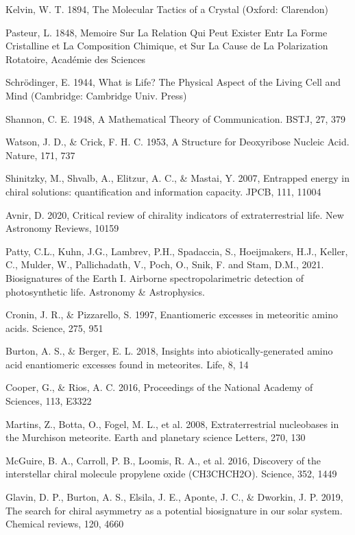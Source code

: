 \documentclass[a4paper,11pt]{article}
\begin{document}
\begin{thebibliography}{99}
Kelvin, W. T. 1894, The Molecular Tactics of a Crystal (Oxford: Clarendon)


 Pasteur, L. 1848, Memoire Sur La Relation Qui Peut
Exister Entr La Forme Cristalline et La Composition
Chimique, et Sur La Cause de La Polarization Rotatoire, Acad\'emie des Sciences

Schrödinger, E. 1944, What is Life? The Physical Aspect of the Living Cell and Mind (Cambridge: Cambridge Univ. Press)

Shannon, C. E. 1948, A Mathematical Theory of Communication. BSTJ, 27, 379

 Watson, J. D., \& Crick, F. H. C. 1953, A Structure for Deoxyribose Nucleic Acid. Nature, 171, 737

Shinitzky, M., Shvalb, A., Elitzur, A. C., \& Mastai, Y. 2007, Entrapped energy in chiral solutions: quantification and information capacity. JPCB, 111, 11004


Avnir, D. 2020, Critical review of chirality indicators of extraterrestrial life. New Astronomy Reviews, 10159

 Patty, C.L., Kuhn, J.G., Lambrev, P.H., Spadaccia, S., Hoeijmakers, H.J., Keller, C., Mulder, W., Pallichadath, V., Poch, O., Snik, F. and Stam, D.M., 2021. Biosignatures of the Earth I. Airborne spectropolarimetric detection of photosynthetic life. Astronomy \& Astrophysics.

 Cronin, J. R., \& Pizzarello, S. 1997, Enantiomeric excesses in meteoritic amino acids. Science, 275, 951

 Burton, A. S., \& Berger, E. L. 2018, Insights into abiotically-generated amino acid enantiomeric excesses found in meteorites. Life, 8, 14

   Cooper, G., \& Rios, A. C. 2016, Proceedings of the
National Academy of Sciences, 113, E3322


 Martins, Z., Botta, O., Fogel, M. L., et al. 2008, Extraterrestrial nucleobases in the Murchison meteorite. Earth
and planetary science Letters, 270, 130


 McGuire, B. A., Carroll, P. B., Loomis, R. A., et al.
2016, Discovery of the interstellar chiral molecule propylene oxide (CH3CHCH2O). Science, 352, 1449


Glavin, D. P., Burton, A. S., Elsila, J. E., Aponte, J. C.,
\& Dworkin, J. P. 2019, The search for chiral asymmetry as a potential biosignature in our solar system. Chemical reviews, 120, 4660 


\end{thebibliography}
\end{document}
